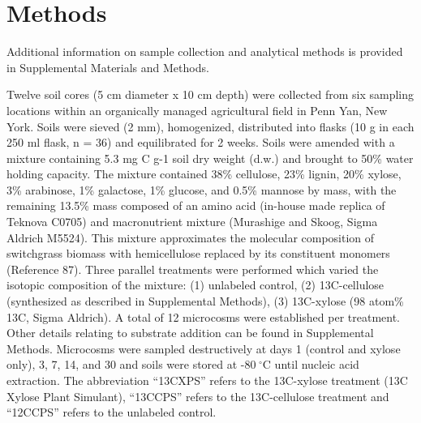 \section{Methods}
Additional information on sample collection and analytical methods is provided
in Supplemental Materials and Methods. 

Twelve soil cores (5 cm diameter x 10 cm depth) were collected from six 
sampling locations within an organically managed agricultural field in Penn
Yan, New York. Soils were sieved (2 mm), homogenized, distributed into flasks
(10 g in each 250 ml flask, n = 36) and equilibrated for 2 weeks. Soils were
amended with a mixture containing 5.3 mg C g-1 soil dry weight (d.w.) and
brought to 50\% water holding capacity. The mixture contained 38\% cellulose,
23\% lignin, 20\% xylose, 3\% arabinose, 1\% galactose, 1\% glucose, and 0.5\%
mannose by mass, with the remaining 13.5\% mass composed of an amino acid
(in-house made replica of Teknova C0705) and macronutrient mixture (Murashige
and Skoog, Sigma Aldrich M5524).  This mixture approximates the molecular
composition of switchgrass biomass with hemicellulose replaced by its
constituent monomers (Reference 87). Three parallel treatments were performed
which varied the isotopic composition of the mixture: (1) unlabeled control,
(2) 13C-cellulose (synthesized as described in Supplemental Methods), (3)
13C-xylose (98 atom\% 13C, Sigma Aldrich). A total of 12 microcosms were
established per treatment. Other details relating to substrate addition can be
found in Supplemental Methods. Microcosms were sampled destructively at days
1 (control and xylose only), 3, 7, 14, and 30 and soils were stored at
-80 $^{\circ}$C until nucleic acid extraction. The abbreviation “13CXPS” refers
to the 13C-xylose treatment (13C Xylose Plant Simulant), “13CCPS” refers to the
13C-cellulose treatment and “12CCPS” refers to the unlabeled control. 

